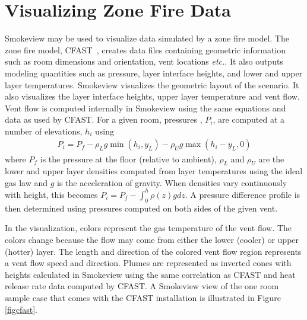 \documentclass[11pt,twoside]{book}
\begin{document}
\chapter{Visualizing Zone Fire Data}
Smokeview may be used to visualize data simulated by a zone fire model.
The zone fire model, CFAST~\cite{Jones:2004A}, creates data files containing geometric information such as room dimensions and orientation, vent locations {\em etc.}.  It also outputs modeling quantities such as pressure, layer interface heights, and lower and upper layer temperatures.
Smokeview visualizes the geometric layout of the scenario.  It also visualizes the layer interface heights, upper layer temperature and vent flow.
Vent flow
is computed internally in Smokeview using the same equations and data as used by CFAST.   For a given room, pressures , $P_i$, are computed at a number of elevations, $h_i$ using
\begin{eqnarray*}
P_i=P_f - \rho_L g \min(h_i,y_L) - \rho_U g \max(h_i-y_L,0)
\end{eqnarray*}
where $P_f$ is the pressure at the floor (relative to ambient), $\rho_L$ and $\rho_U$ are the lower and upper layer densities computed from layer temperatures using the ideal gas law and $g$ is the acceleration of gravity.  When densities vary continuously with height, this becomes $P_i=P_f-\int_0^h \rho(z)gdz$.
A pressure difference profile is then determined using pressures computed on both sides of the given vent.

In the visualization, colors represent the gas temperature of the vent flow.  The colors change because the flow may come from either the lower (cooler) or upper (hotter) layer.   The length and direction of the colored vent flow region represents a vent flow speed and direction.  Plumes are represented as inverted cones with heights calculated in Smokeview using the same correlation as CFAST and heat release rate data computed by CFAST.
A Smokeview view of the one room sample case that comes with the CFAST installation is illustrated in Figure \ref{figcfast}.
\end{document}
